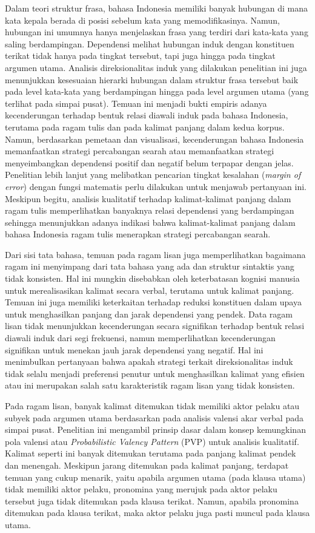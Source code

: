 Dalam teori struktur frasa, bahasa Indonesia memiliki banyak hubungan di mana kata kepala berada di posisi sebelum kata yang memodifikasinya. Namun, hubungan ini umumnya hanya menjelaskan frasa yang terdiri dari kata-kata yang saling berdampingan. Dependensi melihat hubungan induk dengan konstituen terikat tidak hanya pada tingkat tersebut, tapi juga hingga pada tingkat argumen utama. Analisis direksionalitas induk yang dilakukan penelitian ini juga menunjukkan kesesuaian hierarki hubungan dalam struktur frasa tersebut baik pada level kata-kata yang berdampingan hingga pada level argumen utama (yang terlihat pada simpai pusat). Temuan ini menjadi bukti empiris adanya kecenderungan terhadap bentuk relasi diawali induk pada bahasa Indonesia, terutama pada ragam tulis dan pada kalimat panjang dalam kedua korpus. Namun, berdasarkan pemetaan dan visualisasi, kecenderungan bahasa Indonesia memanfaatkan strategi percabangan searah atau memanfaatkan strategi menyeimbangkan dependensi positif dan negatif belum terpapar dengan jelas. Penelitian lebih lanjut yang melibatkan pencarian tingkat kesalahan (\textit{margin of error}) dengan fungsi matematis perlu dilakukan untuk menjawab pertanyaan ini. Meskipun begitu, analisis kualitatif terhadap kalimat-kalimat panjang dalam ragam tulis memperlihatkan banyaknya relasi dependensi yang berdampingan sehingga menunjukkan adanya indikasi bahwa kalimat-kalimat panjang dalam bahasa Indonesia ragam tulis menerapkan strategi percabangan searah.

Dari sisi tata bahasa, temuan pada ragam lisan juga memperlihatkan bagaimana ragam ini menyimpang dari tata bahasa yang ada dan struktur sintaktis yang tidak konsisten. Hal ini mungkin disebabkan oleh keterbatasan kognisi manusia untuk merealisasikan kalimat secara verbal, terutama untuk kalimat panjang. Temuan ini juga memiliki keterkaitan terhadap reduksi konstituen dalam upaya untuk menghasilkan panjang dan jarak dependensi yang pendek. Data ragam lisan tidak menunjukkan kecenderungan secara signifikan terhadap bentuk relasi diawali induk dari segi frekuensi, namun memperlihatkan kecenderungan signifikan untuk menekan jauh jarak dependensi yang negatif. Hal ini menimbulkan pertanyaan bahwa apakah strategi terkait direksionalitas induk tidak selalu menjadi preferensi penutur untuk menghasilkan kalimat yang efisien atau ini merupakan salah satu karakteristik ragam lisan yang tidak konsisten.

Pada ragam lisan, banyak kalimat ditemukan tidak memiliki aktor pelaku atau subyek pada argumen utama berdasarkan pada analisis valensi akar verbal pada simpai pusat. Penelitian ini mengambil prinsip dasar dalam konsep kemungkinan pola valensi atau \textit{Probabilistic Valency Pattern} (PVP) \citep{liu2006syntactic} untuk analisis kualitatif. Kalimat seperti ini banyak ditemukan terutama pada panjang kalimat pendek dan menengah. Meskipun jarang ditemukan pada kalimat panjang, terdapat temuan yang cukup menarik, yaitu apabila argumen utama (pada klausa utama) tidak memiliki aktor pelaku, pronomina yang merujuk pada aktor pelaku tersebut juga tidak ditemukan pada klausa terikat. Namun, apabila pronomina ditemukan pada klausa terikat, maka aktor pelaku juga pasti muncul pada klausa utama. 

